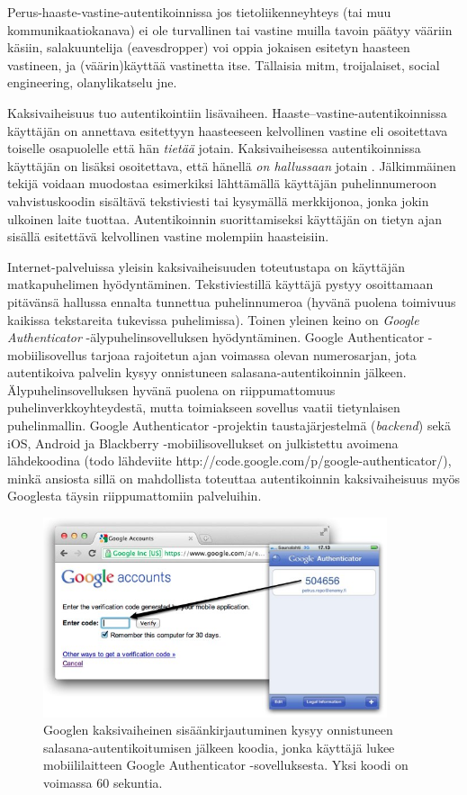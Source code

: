 \documentclass[finnish,gradu]{tktltiki}
\begin{document}
  Perus-haaste-vastine-autentikoinnissa jos tietoliikenneyhteys (tai muu kommunikaatiokanava) ei ole turvallinen tai vastine muilla tavoin päätyy vääriin käsiin, salakuuntelija (eavesdropper) voi oppia jokaisen esitetyn haasteen vastineen, ja (väärin)käyttää vastinetta itse.
  Tällaisia mitm, troijalaiset, social engineering, olanylikatselu jne.

  Kaksivaiheisuus tuo autentikointiin lisävaiheen. Haaste--vastine-autentikoinnissa käyttäjän on annettava esitettyyn haasteeseen kelvollinen vastine eli osoitettava toiselle osapuolelle että hän \emph{tietää} jotain. Kaksivaiheisessa autentikoinnissa käyttäjän on lisäksi osoitettava, että hänellä \emph{on hallussaan} jotain \cite{NIST_SP800-63-1, google_2step_2010}. Jälkimmäinen tekijä voidaan muodostaa esimerkiksi lähttämällä käyttäjän puhelinnumeroon vahvistuskoodin sisältävä tekstiviesti tai kysymällä merkkijonoa, jonka jokin ulkoinen laite tuottaa. Autentikoinnin suorittamiseksi käyttäjän on tietyn ajan sisällä esitettävä kelvollinen vastine molempiin haasteisiin.

  Internet-palveluissa yleisin kaksivaiheisuuden toteutustapa on käyttäjän matkapuhelimen hyödyntäminen. Tekstiviestillä käyttäjä pystyy osoittamaan pitävänsä hallussa ennalta tunnettua puhelinnumeroa (hyvänä puolena toimivuus kaikissa tekstareita tukevissa puhelimissa). Toinen yleinen keino on \emph{Google Authenticator} -älypuhelinsovelluksen hyödyntäminen. Google Authenticator -mobiilisovellus tarjoaa rajoitetun ajan voimassa olevan numerosarjan, jota autentikoiva palvelin kysyy onnistuneen salasana-autentikoinnin jälkeen. Älypuhelinsovelluksen hyvänä puolena on riippumattomuus puhelinverkkoyhteydestä, mutta toimiakseen sovellus vaatii tietynlaisen puhelinmallin. Google Authenticator -projektin taustajärjestelmä (\emph{backend}) sekä iOS, Android ja Blackberry -mobiilisovellukset on julkistettu avoimena lähdekoodina (todo lähdeviite http://code.google.com/p/google-authenticator/), minkä ansiosta sillä on mahdollista toteuttaa autentikoinnin kaksivaiheisuus myös Googlesta täysin riippumattomiin palveluihin.

  \begin{figure}
    \centering
    \includegraphics[width=0.9\textwidth]{images/google_authenticator.jpg}
    \caption{Googlen kaksivaiheinen sisäänkirjautuminen kysyy onnistuneen salasana-autentikoitumisen jälkeen koodia, jonka käyttäjä lukee mobiililaitteen Google Authenticator -sovelluksesta. Yksi koodi on voimassa 60 sekuntia.}
    \label{fig:google_authenticator}
  \end{figure}
\end{document}
